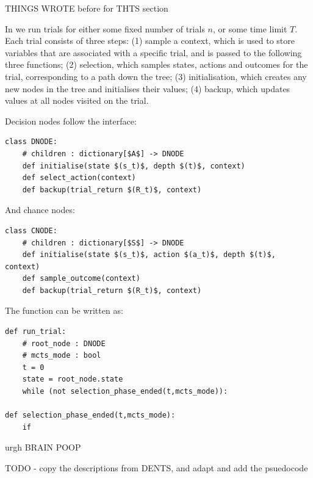     
    



\clearpage
THINGS WROTE before for THTS section 
\clearpage







        
        In \thtspp\ewe we run trials for either some fixed number of trials $n$, or some time limit $T$. Each trial 
        consists of three steps: 
        (1) sample a context, which is used to store variables that are associated with a specific trial, and is passed to the following three functions;
        (2) selection, which samples states, actions and outcomes for the trial, corresponding to a path down the tree;
        (3) initialisation, which creates any new nodes in the tree and initialises their values;
        (4) backup, which updates values at all nodes visited on the trial.

        Decision nodes follow the interface:
        \begin{lstlisting}
class DNODE:
    # children : dictionary[$A$] -> DNODE
    def initialise(state $(s_t)$, depth $(t)$, context)
    def select_action(context)
    def backup(trial_return $(R_t)$, context)
        \end{lstlisting}

        And chance nodes:
        \begin{lstlisting}
class CNODE:
    # children : dictionary[$S$] -> DNODE
    def initialise(state $(s_t)$, action $(a_t)$, depth $(t)$, context)
    def sample_outcome(context)
    def backup(trial_return $(R_t)$, context)
        \end{lstlisting}

        The \runtrial function can be written as:
        \begin{lstlisting}
def run_trial:
    # root_node : DNODE
    # mcts_mode : bool
    t = 0
    state = root_node.state
    while (not selection_phase_ended(t,mcts_mode)):

def selection_phase_ended(t,mcts_mode):
    if 
        \end{lstlisting}


        urgh BRAIN POOP

        TODO - copy the descriptions from DENTS, and adapt and add the psuedocode












